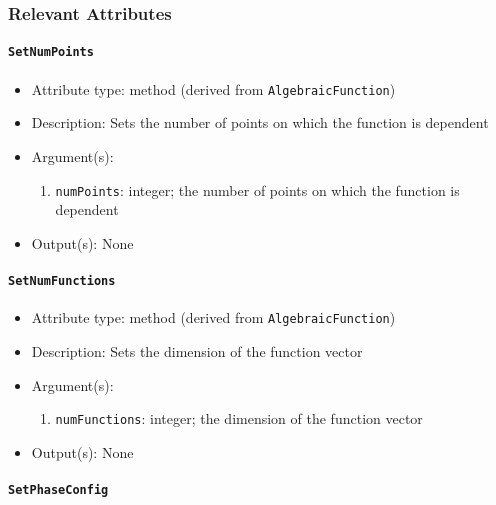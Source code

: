 \documentclass[]{article}
\begin{document}
\subsubsection{Relevant Attributes}

\paragraph{\texttt{SetNumPoints}}

\begin{itemize}
	\item Attribute type: method (derived from \texttt{AlgebraicFunction})
	\item Description: Sets the number of points on which the function is dependent
	\item Argument(s):
	\begin{enumerate}
		\item \texttt{numPoints}: integer; the number of points on which the function is dependent
	\end{enumerate}
	\item Output(s): None
\end{itemize}

\paragraph{\texttt{SetNumFunctions}}

\begin{itemize}
	\item Attribute type: method (derived from \texttt{AlgebraicFunction})
	\item Description: Sets the dimension of the function vector
	\item Argument(s):
	\begin{enumerate}
		\item \texttt{numFunctions}: integer; the dimension of the function vector
	\end{enumerate}
	\item Output(s): None
\end{itemize}

\paragraph{\texttt{SetPhaseConfig}}
\end{document}
